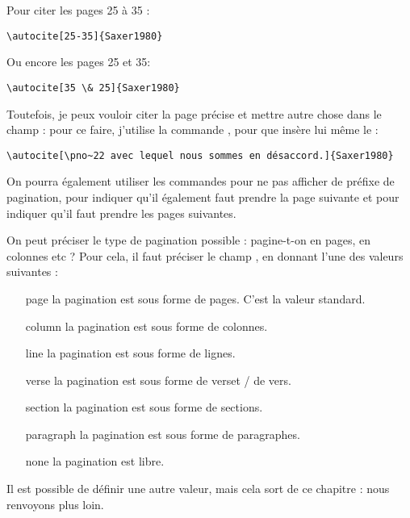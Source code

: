  Pour citer les pages 25 à 35 :

\begin{verbatim}
\autocite[25-35]{Saxer1980}
\end{verbatim}

Ou encore les pages 25 et 35:

\begin{verbatim}
\autocite[35 \& 25]{Saxer1980}
\end{verbatim}

Toutefois, je peux vouloir citer la page précise et mettre autre chose dans le champ  : pour ce faire, j'utilise la commande , pour que  insère lui même le  :

\begin{verbatim}
\autocite[\pno~22 avec lequel nous sommes en désaccord.]{Saxer1980}
\end{verbatim}

\begin{quotation}
	\parencite[\pno~22 avec lequel nous sommes en désaccord.]{Saxer1980}
\end{quotation}

On pourra également utiliser les commandes  pour ne pas afficher de préfixe de pagination,   pour indiquer qu'il également faut prendre la page suivante et  pour indiquer qu'il faut prendre les pages suivantes.

On peut préciser le type de pagination possible : pagine-t-on en pages, en colonnes etc ? Pour cela, il faut préciser le champ , en donnant l'une des valeurs suivantes : 

\begin{enumerate}
\item[page]la pagination est sous forme de pages. C'est la valeur standard.
\item[column]la pagination est sous forme de colonnes.
\item[line]la pagination est sous forme de lignes.
\item[verse]la pagination est sous forme de verset / de vers. 
\item[section]la pagination est sous forme de sections.
\item[paragraph]la pagination est sous forme de paragraphes.
\item[none]la pagination est libre.
\end{enumerate}

\begin{anedocte}
Il est possible de définir une autre valeur, mais cela sort de ce chapitre : nous renvoyons plus loin. 

\end{anedocte}

